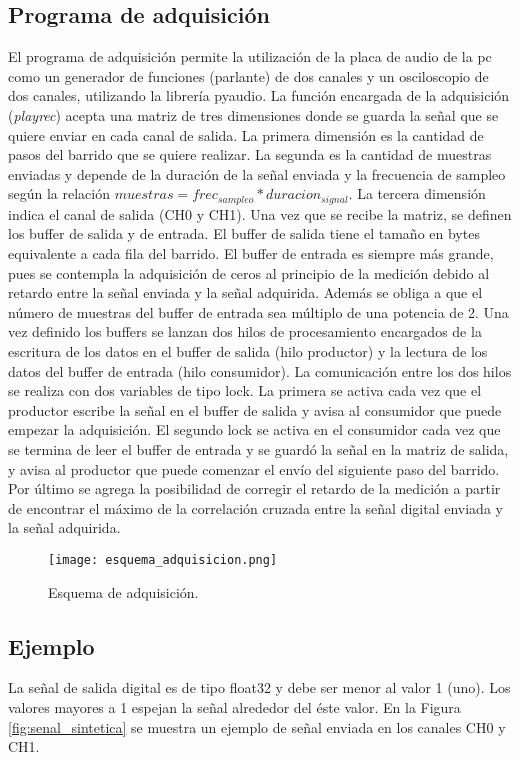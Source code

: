 \documentclass[a4paper, 11pt]{article}
\begin{document}
\subsection*{Programa de adquisición}
El programa de adquisición permite la utilización de la placa de audio de la pc como un generador de funciones (parlante) de dos canales y un osciloscopio de dos canales, utilizando la librería pyaudio. La función encargada de la adquisición (\textit{playrec}) acepta una matriz de tres dimensiones donde se guarda la señal que se quiere enviar en cada canal de salida. La primera dimensión es la cantidad de pasos del barrido que se quiere realizar. La segunda es la cantidad de muestras enviadas y depende de la duración de la señal enviada y la frecuencia de sampleo según la relación $muestras=frec_{sampleo}*duracion_{signal}$. La tercera dimensión indica el canal de salida (CH0 y CH1).
Una vez que se recibe la matriz, se definen los buffer de salida y de entrada. El buffer de salida tiene el tamaño en bytes equivalente a cada fila del barrido. El buffer de entrada es siempre más grande, pues se contempla la adquisición de ceros al principio de la medición debido al retardo entre la señal enviada y la señal adquirida. Además se obliga a que el número de muestras del buffer de entrada sea múltiplo de una potencia de 2.
Una vez definido los buffers se lanzan dos hilos de procesamiento encargados de la escritura de los datos en el buffer de salida (hilo productor) y la lectura de los datos del buffer de entrada (hilo consumidor). La comunicación entre los dos hilos se realiza con dos variables de tipo lock. La primera se activa cada vez que el productor escribe la señal en el buffer de salida y avisa al consumidor que puede empezar la adquisición. El segundo lock se activa en el consumidor cada vez que se termina de leer el buffer de entrada y se guardó la señal en la matriz de salida, y avisa al productor que puede comenzar el envío del siguiente paso del barrido.
Por último se agrega la posibilidad de corregir el retardo de la medición a partir de encontrar el máximo de la correlación cruzada entre la señal digital enviada y la señal adquirida.

\begin{figure} [H]
\centering
\texttt{[image: esquema\_adquisicion.png]}
\caption{Esquema de adquisición. \label{fig:esquema_adquisiciona}}
\end{figure} 


\subsection*{Ejemplo}
La señal de salida digital es de tipo float32 y debe ser menor al valor 1 (uno). Los valores mayores a 1 espejan la señal alrededor del éste valor. En la Figura \ref{fig:senal_sintetica} se muestra un ejemplo de señal enviada en los canales CH0 y CH1. 
\end{document}
